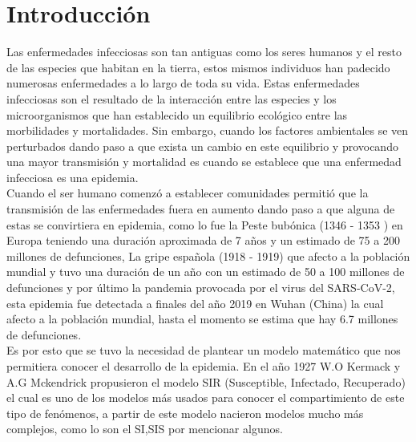 \documentclass[a4paper,openright,12pt]{book}
\begin{document}
\section*{\Large{Introducción\\}}

Las enfermedades infecciosas son tan antiguas como los seres humanos y el resto de las especies que habitan en la tierra, estos mismos individuos han padecido numerosas enfermedades a lo largo de toda su vida. Estas enfermedades infecciosas son el resultado de la interacción entre las especies y los microorganismos que han establecido un equilibrio ecológico entre las morbilidades y mortalidades. Sin embargo, cuando los factores ambientales se ven perturbados dando paso a que exista un cambio en este equilibrio y provocando una mayor transmisión y mortalidad es cuando se establece que una enfermedad infecciosa es una epidemia. \\

Cuando el ser humano comenzó a establecer comunidades permitió que la transmisión de las enfermedades fuera en aumento dando paso a que alguna de estas se convirtiera en epidemia, como lo fue la Peste bubónica (1346 - 1353 ) en Europa  teniendo una duración aproximada de 7 años y un estimado de 75 a 200 millones de defunciones, La gripe española (1918 - 1919) que afecto a la población mundial y tuvo una duración de un año con un estimado de 50 a 100 millones de defunciones y por último la pandemia provocada por el virus del SARS-CoV-2, esta epidemia fue detectada a finales del año 2019 en Wuhan (China) la cual afecto a la población mundial, hasta el momento se estima que hay 6.7 millones de defunciones.\\

Es por esto que se tuvo la necesidad de plantear un modelo matemático que nos permitiera conocer el desarrollo de la epidemia. En el año 1927 W.O Kermack y A.G Mckendrick propusieron el modelo SIR (Susceptible, Infectado, Recuperado) el cual es uno de los modelos más usados para conocer el compartimiento de este tipo de fenómenos, a partir de este modelo nacieron modelos mucho más complejos, como lo son el SI,SIS por mencionar algunos. \\
\end{document}
